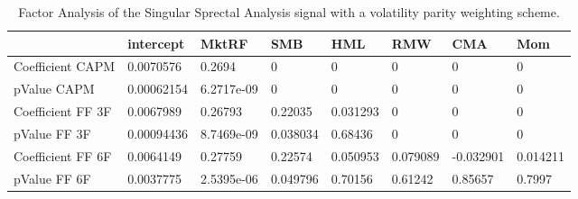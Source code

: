 \begin{table}[H]
\centering
\begin{tabular}{llllllll}
& intercept & MktRF & SMB & HML & RMW & CMA & Mom \\ 
\hline 
Coefficient CAPM & 0.0070576 & 0.2694 & 0 & 0 & 0 & 0 & 0 \\ 
pValue CAPM & 0.00062154 & 6.2717e-09 & 0 & 0 & 0 & 0 & 0 \\ 
Coefficient FF 3F & 0.0067989 & 0.26793 & 0.22035 & 0.031293 & 0 & 0 & 0 \\ 
pValue FF 3F & 0.00094436 & 8.7469e-09 & 0.038034 & 0.68436 & 0 & 0 & 0 \\ 
Coefficient FF 6F & 0.0064149 & 0.27759 & 0.22574 & 0.050953 & 0.079089 & -0.032901 & 0.014211 \\ 
pValue FF 6F & 0.0037775 & 2.5395e-06 & 0.049796 & 0.70156 & 0.61242 & 0.85657 & 0.7997 \\ 
\hline
\end{tabular}
\caption{Factor Analysis of the Singular Sprectal Analysis signal with a volatility parity weighting scheme.}
\label{SSA_IndQuantity_FACTOR}
\end{table}